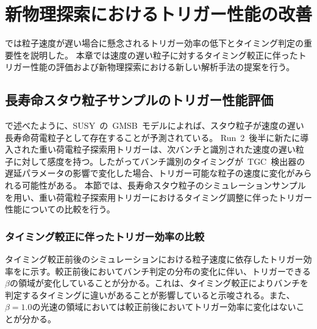 \chapter{新物理探索におけるトリガー性能の改善}
\thispagestyle{empty}
\label{chap:6}
では粒子速度が遅い場合に懸念されるトリガー効率の低下とタイミング判定の重要性を説明した。
本章では速度の遅い粒子に対するタイミング較正に伴ったトリガー性能の評価および新物理探索における新しい解析手法の提案を行う。

\section{長寿命スタウ粒子サンプルのトリガー性能評価}
で述べたように、SUSY~の~GMSB~モデルによれば、スタウ粒子が速度の遅い長寿命荷電粒子として存在することが予測されている。
Run~2~後半に新たに導入された重い荷電粒子探索用トリガーは、次バンチと識別された速度の遅い粒子に対して感度を持つ。したがってバンチ識別のタイミングが~TGC~検出器の遅延パラメータの影響で変化した場合、トリガー可能な粒子の速度に変化がみられる可能性がある。
本節では、長寿命スタウ粒子のシミュレーションサンプルを用い、重い荷電粒子探索用トリガーにおけるタイミング調整に伴ったトリガー性能についての比較を行う。

\subsection{タイミング較正に伴ったトリガー効率の比較}\label{sec:tribeta}
タイミング較正前後のシミュレーションにおける粒子速度に依存したトリガー効率をに示す。較正前後においてバンチ判定の分布の変化に伴い、トリガーできる$\beta$の領域が変化していることが分かる。これは、タイミング較正によりバンチを判定するタイミングに違いがあることが影響していると示唆される。また、$\beta=1.0$の光速の領域においては較正前後においてトリガー効率に変化はないことが分かる。

